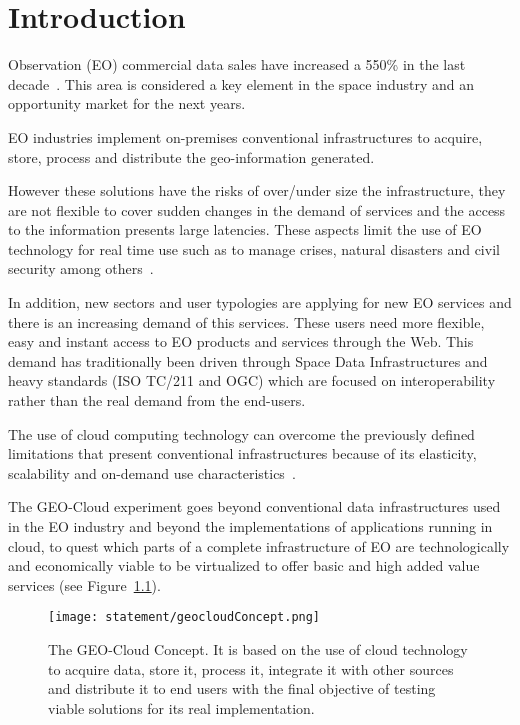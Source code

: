 \chapter{Introduction}

 Observation (\acs{EO}) commercial data sales have increased a 550\% in
the last decade~\cite{Euroconsult2010}. This area is considered a key element in the
space industry and an opportunity market for the next years.

\ac{EO} industries implement on-premises conventional infrastructures to acquire,
store, process and distribute the geo-information generated.

However these solutions have the risks of over/under size the infrastructure, they are not flexible to cover sudden changes in the demand of services and the access to the information presents large latencies.  These aspects limit the use of \ac{EO} technology for real time use such as to manage crises, natural disasters and civil security among others~\cite{Deren2007}.

In addition, new sectors and user typologies are applying for new \ac{EO} services
and there is an increasing demand of this services. These users
need more flexible, easy and instant access to \ac{EO} products and services through
the Web. This demand has traditionally been driven through Space Data
Infrastructures and heavy standards (\acs{ISO} TC/211 and \ac{OGC}) which are focused on
interoperability rather than the real demand from the end-users.

The use of cloud computing technology can overcome the previously defined limitations that present conventional infrastructures because of its elasticity, scalability and on-demand use characteristics~\cite{Ambrust2010}.

The GEO-Cloud experiment goes beyond conventional data infrastructures used in
the \ac{EO}
industry and beyond the implementations of applications running in cloud, to
quest which parts of a complete infrastructure of \ac{EO} are technologically and
economically viable to be virtualized to offer basic and high added value
services (see Figure~\ref{fig:intr-geocloudConcept}).

\begin{figure}[!h]
\begin{center}
\texttt{[image: statement/geocloudConcept.png]}
\caption[The GEO-Cloud Concept.]{The GEO-Cloud Concept. It is based on the use of cloud technology to acquire data, store it, process it, integrate it with other sources and distribute it to end users with the final objective of testing viable solutions for its real implementation.}
\label{fig:intr-geocloudConcept}
\end{center}
\end{figure}

